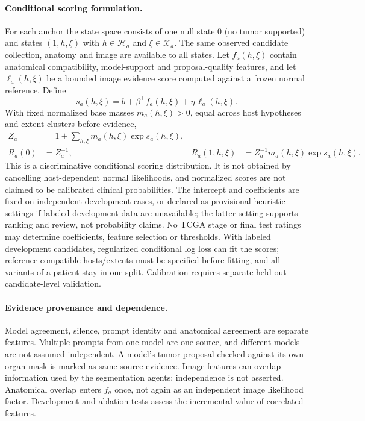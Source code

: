 \documentclass[fleqn,10pt]{olplainarticle}
\begin{document}
\paragraph{Conditional scoring formulation.}
For each anchor the state space consists of one null state $0$ (no tumor supported) and states $(1,h,\xi)$ with
$h\in\mathcal{H}_a$ and $\xi\in\mathcal{X}_a$. The same observed candidate collection, anatomy and image are available to
all states. Let $f_a(h,\xi)$ contain anatomical compatibility, model-support and proposal-quality features, and let
$\ell_a(h,\xi)$ be a bounded image evidence score computed against a frozen normal reference. Define
\begin{equation}
\label{eq:conditional_joint}
s_a(h,\xi)=b+\beta^\top f_a(h,\xi)+\eta\,\ell_a(h,\xi).
\end{equation}
With fixed normalized base masses $m_a(h,\xi)>0$, equal across host hypotheses and extent clusters before evidence,
\begin{equation}
\label{eq:case_posterior}
\begin{aligned}
Z_a&=1+\sum_{h,\xi}m_a(h,\xi)\exp s_a(h,\xi),\\
R_a(0)&=Z_a^{-1},&
R_a(1,h,\xi)&=Z_a^{-1}m_a(h,\xi)\exp s_a(h,\xi).
\end{aligned}
\end{equation}
This is a discriminative conditional scoring distribution. It is not obtained by cancelling host-dependent normal
likelihoods, and normalized scores are not claimed to be calibrated clinical probabilities. The intercept and coefficients
are fixed on independent development cases, or declared as provisional heuristic settings if labeled development data are
unavailable; the latter setting supports ranking and review, not probability claims. No TCGA stage or final test ratings
may determine coefficients, feature selection or thresholds. With labeled development candidates, regularized conditional
log loss can fit the scores; reference-compatible hosts/extents must be specified before fitting, and all variants of a
patient stay in one split. Calibration requires separate held-out candidate-level validation.

\paragraph{Evidence provenance and dependence.}
Model agreement, silence, prompt identity and anatomical agreement are separate features. Multiple prompts from one model
are one source, and different models are not assumed independent. A model's tumor proposal checked against its own organ
mask is marked as same-source evidence. Image features can overlap information used by the segmentation agents; independence
is not asserted. Anatomical overlap enters $f_a$ once, not again as an independent image likelihood factor. Development
and ablation tests assess the incremental value of correlated features.
\end{document}
